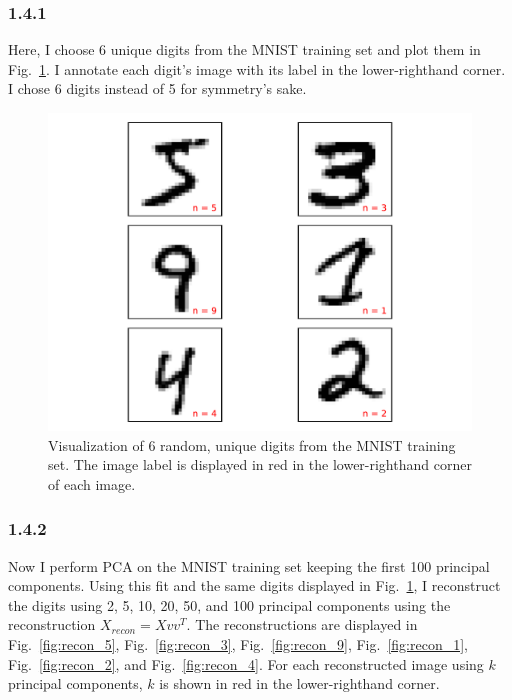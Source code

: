 \documentclass[12pt]{amsart}
\begin{document}
\subsubsection*{1.4.1}
Here, I choose 6 unique digits from the MNIST training set and plot them in Fig.~\ref{fig:mnist_digits}.  I annotate each digit's image with its label in the lower-righthand corner.  I chose 6 digits instead of 5 for symmetry's sake.
\begin{figure}[H]
	\includegraphics[width=\columnwidth]{mnist_digits.pdf}
    \caption{Visualization of 6 random, unique digits from the MNIST training set.  The image label is displayed in red in the lower-righthand corner of each image.}
    \label{fig:mnist_digits}
\end{figure}

\subsubsection*{1.4.2}

Now I perform PCA on the MNIST training set keeping the first 100 principal components.  Using this fit and the same digits displayed in Fig.~\ref{fig:mnist_digits}, I reconstruct the digits using 2, 5, 10, 20, 50, and 100 principal components using the reconstruction $X_{recon} = Xvv^T$.  The reconstructions are displayed in Fig.~\ref{fig:recon_5}, Fig.~\ref{fig:recon_3}, Fig.~\ref{fig:recon_9}, Fig.~\ref{fig:recon_1}, Fig.~\ref{fig:recon_2}, and Fig.~\ref{fig:recon_4}.  For each reconstructed image using $k$ principal components, $k$ is shown in red in the lower-righthand corner.
\end{document}
